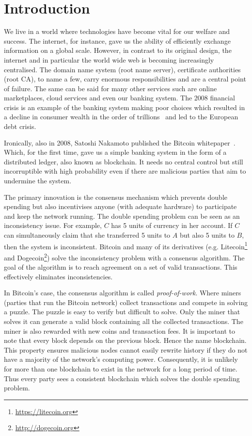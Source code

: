 \chapter{Introduction}
\label{ch:intro}

We live in a world where technologies have become vital for our welfare and success.
The internet, for instance, gave us the ability of efficiently exchange information on a global scale.
However, in contrast to its original design, the internet and in particular the world wide web is becoming increasingly centralised.
The domain name system (root name server), certificate authorities (root CA), to name a few, carry enormous responsibilities and are a central point of failure.
The  same can be said for many other services such are online marketplaces,
cloud services and even our banking system.
The 2008 financial crisis is an example of the banking system making poor choices which resulted in a
decline in consumer wealth in the order of trillions~\cite{financialcrisis} and led to the European debt crisis.

Ironically, also in 2008, Satoshi Nakamoto published the Bitcoin whitepaper~\cite{bitcoin}.
Which, for the first time, gave us a simple banking system in the form of a distributed ledger, also known as blockchain.
It needs no central control but still incorruptible with high probability even if there are malicious parties that aim to undermine the system.

The primary innovation is the consensus mechanism which prevents double spending but also incentivises anyone (with adequate hardware) to participate and keep the network running.
The double spending problem can be seen as an inconsistency issue.
For example, $C$ has 5 units of currency in her account.
If $C$ can simultaneously claim that she transferred 5 units to $A$ but also 5 units to $B$, then the system is inconsistent.
Bitcoin and many of its derivatives (e.g. Litecoin\footnote{\url{https://litecoin.org}} and Dogecoin\footnote{\url{http://dogecoin.org}}) solve the inconsistency problem with a consensus algorithm.
The goal of the algorithm is to reach agreement on a set of valid transactions. 
This effectively eliminates inconsistencies.

In Bitcoin's case, the consensus algorithm is called \emph{proof-of-work}.
Where miners (parties that run the Bitcoin network) collect transactions and compete in solving a puzzle.
The puzzle is easy to verify but difficult to solve.
Only the miner that solves it can generate a valid block containing all the collected transactions.
The miner is also rewarded with new coins and transaction fees.
It is important to note that every block depends on the previous block.
Hence the name blockchain.
This property ensures malicious nodes cannot easily rewrite history if they do not have a majority of the network's computing power.
Consequently, it is unlikely for more than one blockchain to exist in the network for a long period of time.
Thus every party sees a consistent blockchain which solves the double spending problem.

